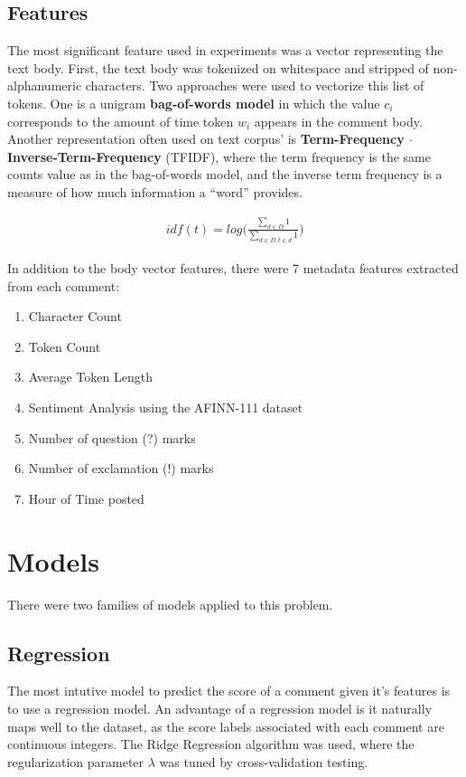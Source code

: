 \documentclass[11pt, twocolumn]{article}
\begin{document}
	\subsection{Features}
	The most significant feature used in experiments was a vector representing the text body. First, the text body was tokenized on whitespace and stripped of non-alphanumeric characters. Two approaches were used to vectorize this list of tokens. One is a unigram \textbf{bag-of-words model} in which the value $c_i$ corresponds to the amount of time token $w_i$ appears in the comment body. Another representation often used on text corpus' is \textbf{Term-Frequency $\cdot$Inverse-Term-Frequency} (TFIDF), where the term frequency is the same counts value as in the bag-of-words model, and the inverse term frequency is a measure of how much information a ``word'' provides.
	
	\begin{gather*}
		idf(t) = log \bigg( \frac{\sum_{d \in D}{1}}{\sum_{d \in D; t \in d}{1}} \bigg)
	\end{gather*}
		
	In addition to the body vector features, there were 7 metadata features extracted from each comment:
	\begin{enumerate}
		\setlength\itemsep{-0.3em}
		\item Character Count
		\item Token Count
		\item Average Token Length
		\item Sentiment Analysis using the AFINN-111 dataset \cite{sentiment} 
		\item Number of question (?) marks
		\item Number of exclamation (!) marks
		\item Hour of Time posted
	\end{enumerate}

\section{Models}
	There were two families of models  applied to this problem.
	
	\subsection{Regression}
	The most intutive model to predict the score of a comment given it's features is to use a regression model. An advantage of a regression model is it naturally maps well to the dataset, as the score labels associated with each comment are continuous integers. The Ridge Regression algorithm was used, where the regularization parameter $\lambda$ was tuned by cross-validation testing.
	
\end{document}
